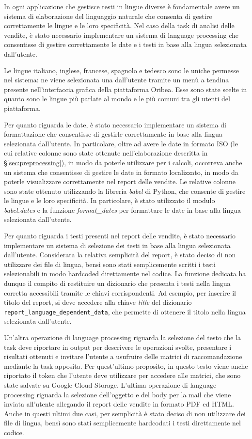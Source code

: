 In ogni applicazione che gestisce testi in lingue diverse è fondamentale avere un sistema di elaborazione del linguaggio naturale che consenta di gestire correttamente le lingue e le loro specificità. Nel caso della task di analisi delle vendite, è stato necessario implementare un sistema di language processing che consentisse di gestire correttamente le date e i testi in base alla lingua selezionata dall'utente.

Le lingue italiano, inglese, francese, spagnolo e tedesco sono le uniche permesse nel sistema: ne viene selezionata una dall'utente tramite un menù a tendina presente nell'interfaccia grafica della piattaforma Oribea. Esse sono state scelte in quanto sono le lingue più parlate al mondo e le più comuni tra gli utenti del piattaforma.

Per quanto riguarda le date, è stato necessario implementare un sistema di formattazione che consentisse di gestirle correttamente in base alla lingua selezionata dall'utente. In particolare, oltre ad avere le date in formato ISO (le cui relative colonne sono state ottenute nell'elaborazione descritta in \S\ref{sec:preprocessing}), in modo da poterle utilizzare per i calcoli, occorreva anche un sistema che consentisse di gestire le date in formato localizzato, in modo da poterle visualizzare correttamente nel report delle vendite.
Le relative colonne sono state ottenuto utilizzando la libreria \emph{babel} di Python, che consente di gestire le lingue e le loro specificità. In particolare, è stato utilizzato il modulo \emph{babel.dates} e la funzione \emph{format\_dates} per formattare le date in base alla lingua selezionata dall'utente.

Per quanto riguarda i testi presenti nel report delle vendite, è stato necessario implementare un sistema di selezione dei testi in base alla lingua selezionata dall'utente. Considerata la relativa semplicità del report, è stato deciso di non utilizzare dei file di lingua, bensì sono stati semplicemente scritti i testi selezionabili in modo hardcoded direttamente nel codice.
La funzione dedicata ha dunque il compito di restituire un dizionario che presenta i testi nella lingua corretta accessibili tramite le chiavi corrispondenti. Ad esempio, per inserire il titolo del report, si deve accedere alla chiave \emph{title} del dizionario \texttt{report\_language\_dependent\_data}, che permette di ottenere il titolo nella lingua selezionata dall'utente.

Un'altra operazione di language processing riguarda la selezione del testo che la task deve riportare in output per descrivere le operazioni svolte, presentare i risultati ottenuti e invitare l'utente a usufruire delle matrici di raccomandazione mediante la task apposita. Per quest'ultimo proposito, in questo testo viene anche riportato il token che l'utente deve utilizzare per accedere alle matrici, che sono state salvate su Google Cloud Storage.
L'ultima operazione di language processing riguarda la selezione dell'oggetto e del body per la mail che viene inviata all'utente allegando il report delle vendite in formato PDF ed HTML.
Anche in questi ultimi due casi, per semplicità è stato deciso di non utilizzare dei file di lingua, bensì sono stati semplicemente hardcodati i testi direttamente nel codice.


